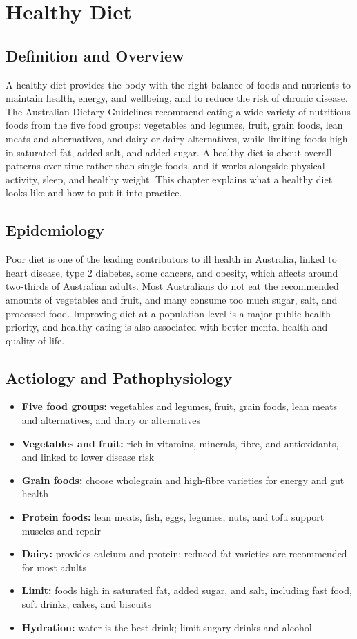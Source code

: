 \chapter{Healthy Diet}

\section*{Definition and Overview}
A healthy diet provides the body with the right balance of foods and nutrients to maintain health, energy, and wellbeing, and to reduce the risk of chronic disease. The Australian Dietary Guidelines recommend eating a wide variety of nutritious foods from the five food groups: vegetables and legumes, fruit, grain foods, lean meats and alternatives, and dairy or dairy alternatives, while limiting foods high in saturated fat, added salt, and added sugar. A healthy diet is about overall patterns over time rather than single foods, and it works alongside physical activity, sleep, and healthy weight. This chapter explains what a healthy diet looks like and how to put it into practice.

\section*{Epidemiology}
Poor diet is one of the leading contributors to ill health in Australia, linked to heart disease, type 2 diabetes, some cancers, and obesity, which affects around two-thirds of Australian adults. Most Australians do not eat the recommended amounts of vegetables and fruit, and many consume too much sugar, salt, and processed food. Improving diet at a population level is a major public health priority, and healthy eating is also associated with better mental health and quality of life.

\section*{Aetiology and Pathophysiology}
\begin{itemize}
    \item \textbf{Five food groups:} vegetables and legumes, fruit, grain foods, lean meats and alternatives, and dairy or alternatives
    \item \textbf{Vegetables and fruit:} rich in vitamins, minerals, fibre, and antioxidants, and linked to lower disease risk
    \item \textbf{Grain foods:} choose wholegrain and high-fibre varieties for energy and gut health
    \item \textbf{Protein foods:} lean meats, fish, eggs, legumes, nuts, and tofu support muscles and repair
    \item \textbf{Dairy:} provides calcium and protein; reduced-fat varieties are recommended for most adults
    \item \textbf{Limit:} foods high in saturated fat, added sugar, and salt, including fast food, soft drinks, cakes, and biscuits
    \item \textbf{Hydration:} water is the best drink; limit sugary drinks and alcohol
\end{itemize}

